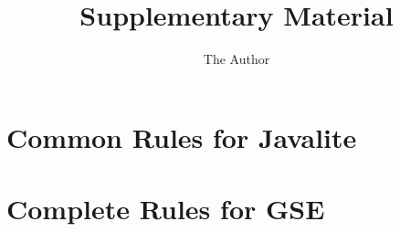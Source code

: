 \documentclass[11pt]{amsart}
\title{Supplementary Material}
\author{The Author}
\begin{document}
\maketitle
\section{Common Rules for Javalite}



\section{Complete Rules for GSE}


\newcommand{\figref}[1]{Figure~\ref{#1}}
\newcommand{\secref}[1]{Section~\ref{#1}}
\newcommand{\thref}[1]{Theorem~\ref{#1}}
\newcommand{\lemref}[1]{Lemma~\ref{#1}}
\newcommand{\defref}[1]{Definition~\ref{#1}}

\newcommand{\sym}{\ensuremath{\varsigma}}
\newcommand{\gse}{\ensuremath{g}}
\newcommand{\rsym}{\ensuremath{\rightarrow_\sym}}
\newcommand{\rssym}{\ensuremath{\leadsto_\sym}}
\newcommand{\rgse}{\ensuremath{\rightarrow_\gse}}
\newcommand{\rsgse}{\ensuremath{\leadsto_\gse}}
\newcommand{\rsum}{\ensuremath{\rightarrow_S}}
\newcommand{\rinit}{\ensuremath{\rightarrow_I}}
\newcommand{\com}{\ensuremath{J}}
\newcommand{\rcom}{\ensuremath{\rightarrow_\com}}
\end{document}
